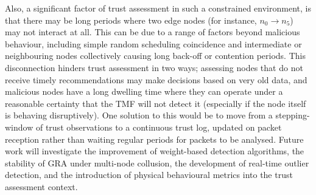 Also, a significant factor of trust assessment in such a constrained environment, is that there may be long periods where two edge nodes (for instance, $n_0 \to n_5$) may not interact at all. 
This can be due to a range of factors beyond malicious behaviour, including simple random scheduling coincidence and intermediate or neighbouring nodes collectively causing long back-off or contention periods.
This disconnection hinders trust assessment in two ways; assessing nodes that do not receive timely recommendations may make decisions based on very old data, and malicious nodes have a long dwelling time where they can operate under a reasonable certainty that the TMF will not detect it (especially if the node itself is behaving disruptively).
One solution to this would be to move from a stepping-window of trust observations to a continuous trust log, updated on packet reception rather than waiting regular periods for packets to be analysed.
Future work will investigate the improvement of weight-based detection algorithms, the stability of GRA under multi-node collusion, the development of real-time outlier detection, and the introduction of physical behavioural metrics into the trust assessment context.





\ifx\ifthesis\undefined
	
\else
\fi
